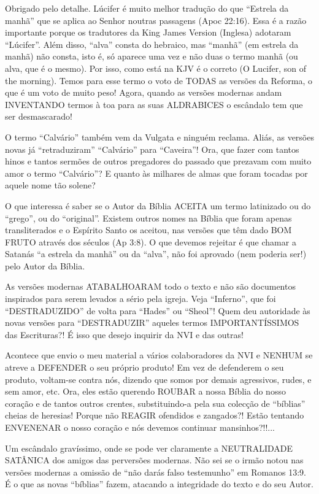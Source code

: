 Obrigado pelo detalhe. Lúcifer é muito melhor tradução do que ``Estrela
da manhã'' que se aplica ao Senhor noutras passagens (Apoc 22:16). Essa
é a razão importante porque os tradutores da King James Version
(Inglesa) adotaram ``Lúcifer''. Além disso, ``alva'' consta do hebraico,
mas ``manhã'' (em estrela da manhã) não consta, isto é, só aparece uma
vez e não duas o termo manhã (ou alva, que é o mesmo). Por isso, como
está na KJV é o correto (O Lucifer, son of the morning). Temos para
esse termo o voto de TODAS as versões da Reforma, o que é um voto de
muito peso! Agora, quando as versões modernas andam INVENTANDO termos
à toa para as suas ALDRABICES o escândalo tem que ser desmascarado!

O termo ``Calvário'' também vem da Vulgata e ninguém reclama. Aliás, as
versões novas já ``retraduziram'' ``Calvário'' para ``Caveira''! Ora, que
fazer com tantos hinos e tantos sermões de outros pregadores do
passado que prezavam com muito amor o termo ``Calvário''? E quanto às
milhares de almas que foram tocadas por aquele nome tão solene?

O que interessa é saber se o Autor da Bíblia ACEITA um termo
latinizado ou do ``grego'', ou do ``original''. Existem outros nomes na
Bíblia que foram apenas transliterados e o Espírito Santo os aceitou,
nas versões que têm dado BOM FRUTO através dos séculos (Ap 3:8). O
que devemos rejeitar é que chamar a Satanás ``a estrela da manhã'' ou da
``alva'', não foi aprovado (nem poderia ser!) pelo Autor da Bíblia.

As versões modernas ATABALHOARAM todo o texto e não são documentos
inspirados para serem levados a sério pela igreja. Veja ``Inferno'', que
foi ``DESTRADUZIDO'' de volta para ``Hades'' ou ``Sheol''! Quem deu
autoridade às novas versões para ``DESTRADUZIR'' aqueles termos
IMPORTANTÍSSIMOS das Escrituras?! É isso que desejo inquirir da NVI e
das outras!

Acontece que envio o meu material a vários colaboradores da NVI e
NENHUM se atreve a DEFENDER o seu próprio produto! Em vez de
defenderem o seu produto, voltam-se contra nós, dizendo que somos por
demais agressivos, rudes, e sem amor, etc. Ora, eles estão querendo
ROUBAR a nossa Bíblia do nosso coração e de tantos outros crentes,
substituindo-a pela sua colecção de ``bíblias'' cheias de heresias!
Porque não REAGIR ofendidos e zangados?! Estão tentando ENVENENAR o
nosso coração e nós devemos continuar mansinhos?!!...

Um escândalo gravíssimo, onde se pode ver claramente a NEUTRALIDADE
SATÂNICA dos amigos das perversões modernas. Não sei se o irmão notou
nas versões modernas a omissão de ``não darás falso testemunho'' em
Romanos 13:9. É o que as novas ``bíblias'' fazem, atacando a
integridade do texto e do seu Autor.

